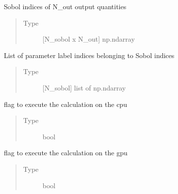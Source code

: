 \documentclass[letterpaper,10pt,english,openany,oneside]{sphinxmanual}
\begin{document}
\begin{fulllineitems}
\begin{fulllineitems}
\end{fulllineitems}


\begin{fulllineitems}
\label{\detokenize{pygpc:pygpc.gpc.gPC.sobol}}
Sobol indices of N\_out output quantities
\begin{quote}\begin{description}
\item[{Type}] \leavevmode
{[}N\_sobol x N\_out{]} np.ndarray

\end{description}\end{quote}

\end{fulllineitems}


\begin{fulllineitems}
\label{\detokenize{pygpc:pygpc.gpc.gPC.sobol_idx}}
List of parameter label indices belonging to Sobol indices
\begin{quote}\begin{description}
\item[{Type}] \leavevmode
{[}N\_sobol{]} list of np.ndarray

\end{description}\end{quote}

\end{fulllineitems}


\begin{fulllineitems}
\label{\detokenize{pygpc:pygpc.gpc.gPC.cpu}}
flag to execute the calculation on the cpu
\begin{quote}\begin{description}
\item[{Type}] \leavevmode
bool

\end{description}\end{quote}

\end{fulllineitems}


\begin{fulllineitems}
\label{\detokenize{pygpc:pygpc.gpc.gPC.gpu}}
flag to execute the calculation on the gpu
\begin{quote}\begin{description}
\item[{Type}] \leavevmode
bool


\end{description}
\end{quote}
\end{fulllineitems}
\end{fulllineitems}
\end{document}

